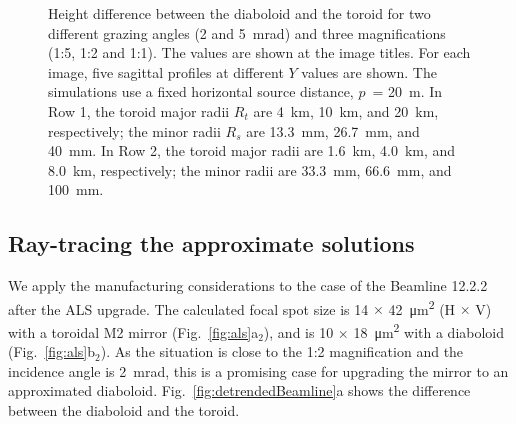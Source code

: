 \documentclass[preprint]{iucr}       %
\newcommand{\inred}[1]{{\color{red}#1}}
\begin{document}
\begin{figure}
\caption{Height difference between the diaboloid and the toroid for two different \inred{grazing angles (2 and \SI{5}{\milli\radian}) and three magnifications (1:5, 1:2 and 1:1). The values are shown at the image titles. For each image, five sagittal profiles at different $Y$ values are shown.} The simulations use a fixed \inred{horizontal} source distance, $p$~= \SI{20}{\meter}. In Row 1, the toroid major radii \inred{$R_t$} are \SI{4}{\kilo\meter}, \SI{10}{\kilo\meter}, and \SI{20}{\kilo\meter}, respectively; the minor radii \inred{$R_s$} are \SI{13.3}{\milli\meter}, \SI{26.7}{\milli\meter}, and \SI{40}{\milli\meter}. In Row 2, the toroid major radii are \SI{1.6}{\kilo\meter}, \SI{4.0}{\kilo\meter}, and \SI{8.0}{\kilo\meter}, respectively; the minor radii are \SI{33.3}{\milli\meter}, \SI{66.6}{\milli\meter}, and \SI{100}{\milli\meter}.}
\end{figure}

\subsection{Ray-tracing the approximate solutions}
We apply the manufacturing considerations to the case of the Beamline 12.2.2 after the ALS upgrade. The calculated focal spot size is 14 $\times$ \SI{42}{\micro\meter^2} (H $\times$ V) with a toroidal M2 mirror (Fig.~\ref{fig:als}a$_2$), and is 10 $\times$ \SI{18}{\micro\meter^2} with a diaboloid (Fig.~\ref{fig:als}b$_2$). As the situation is close to the 1:2 magnification and the incidence angle is \SI{2}{\milli\radian}, this is a promising case for upgrading the mirror to an approximated diaboloid. Fig.~\ref{fig:detrendedBeamline}a shows the difference between the diaboloid and the toroid. 
\end{document}
